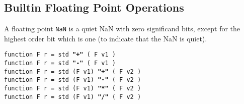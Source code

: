\documentclass[12pt]{article}
\newcommand{\ttkey}[1]{{\tt \bfseries #1}}
\begin{document}
\subsection{Builtin Floating Point Operations}
\label{BUILTIN-FLOATING-POINT-OPERATIONS}

A floating point {\tt NaN}
is a quiet NaN with zero significand bits, except for the
highest order bit which is one (to indicate that the NaN is quiet).

{\tt function F r = std \ttkey{"+"} ( F v1 )} \\
{\tt function F r = std \ttkey{"-"} ( F v1 )} \\
{\tt function F r = std (F v1) \ttkey{"+"} ( F v2 )} \\
{\tt function F r = std (F v1) \ttkey{"-"} ( F v2 )} \\
{\tt function F r = std (F v1) \ttkey{"*"} ( F v2 )} \\
{\tt function F r = std (F v1) \ttkey{"/"} ( F v2 )}
\end{document}
